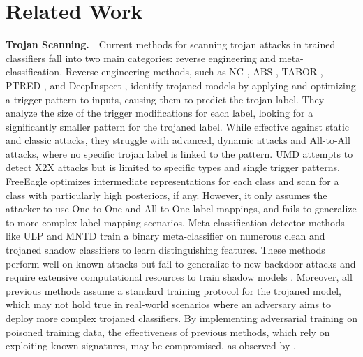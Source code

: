 \section{Related Work}


\textbf{Trojan Scanning.}\ \ Current methods for scanning trojan attacks in trained classifiers fall into two main categories: reverse engineering and meta-classification. Reverse engineering methods, such as NC \cite{NC}, ABS \cite{ABS}, TABOR \cite{TABOR}, PTRED \cite{PTRED}, and DeepInspect \cite{DeepInspect}, identify trojaned models by applying and optimizing a trigger pattern to inputs, causing them to predict the trojan label. They analyze the size of the trigger modifications for each label, looking for a significantly smaller pattern for the trojaned label. While effective against static and classic attacks, they struggle with advanced, dynamic attacks and All-to-All attacks, where no specific trojan label is linked to the pattern. UMD \cite{umd} attempts to detect X2X attacks but is limited to specific types and single trigger patterns. FreeEagle \cite{freeeagle} optimizes intermediate representations for each class and scan for a class with particularly high posteriors, if any. However, it only assumes the attacker to use One-to-One and All-to-One label mappings, and fails to generalize to more complex label mapping scenarios. Meta-classification detector methods like ULP\cite{ULP} and MNTD \cite{MNTD} train a binary meta-classifier on numerous clean and trojaned shadow classifiers to learn distinguishing features. These methods perform well on known attacks but fail to generalize to new backdoor attacks and require extensive computational resources to train shadow models \cite{xiang2024cbd}. Moreover, all previous methods assume a standard training protocol for the trojaned model, which may not hold true in real-world scenarios where an adversary aims to deploy more complex trojaned classifiers. By implementing adversarial training on poisoned training data, the effectiveness of previous methods, which rely on exploiting known signatures, may be compromised, as observed by \cite{odyssey,zhang2021cassandra}. 

